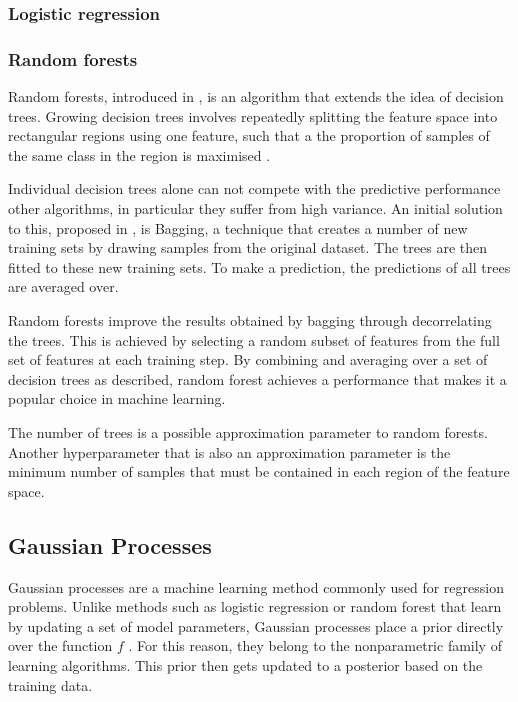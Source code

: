 \documentclass[a4paper,12pt,twoside,openright]{report}
\begin{document}

\subsubsection{Logistic regression}

\subsubsection{Random forests}
Random forests, introduced in \cite{rndforests}, is an algorithm that extends the idea of decision trees. Growing decision trees involves repeatedly splitting the feature space into rectangular regions using one feature, such that a the proportion of samples of the same class in the region is maximised \cite{james2014introduction}. 

Individual decision trees alone can not compete with the predictive performance other algorithms, in particular they suffer from high variance. An initial solution to this, proposed in \cite{bagging}, is Bagging, a technique that creates a number of new training sets by drawing samples from the original dataset. The trees are then fitted to these new training sets. To make a prediction, the predictions of all trees are averaged over.

Random forests improve the results obtained by bagging through decorrelating the trees. This is achieved by selecting a random subset of features from the full set of features at each training step. By combining and averaging over a set of decision trees as described, random forest achieves a performance that makes it a popular choice in machine learning.

The number of trees is a possible approximation parameter to random forests. Another hyperparameter that is also an approximation parameter is the minimum number of samples that must be contained in each region of the feature space.

\subsection{Gaussian Processes}
Gaussian processes are a machine learning method commonly used for regression problems. Unlike methods such as logistic regression or random forest that learn by updating a set of model parameters, Gaussian processes place a prior directly over the function $f$ \cite{Murphy:2012:MLP:2380985}. For this reason, they belong to the nonparametric family of learning algorithms. This prior then gets updated to a posterior based on the training data.
\end{document}
